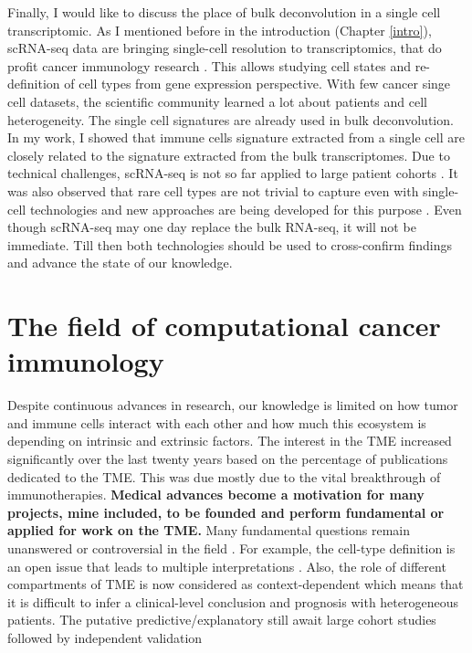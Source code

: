\documentclass[12pt,]{book}
\theoremstyle{definition}
\theoremstyle{definition}
\theoremstyle{definition}
\theoremstyle{remark}
\begin{document}
Finally, I would like to discuss the place of bulk deconvolution in a
single cell transcriptomic. As I mentioned before in the introduction
(Chapter \ref{intro}), scRNA-seq data are bringing single-cell
resolution to transcriptomics, that do profit cancer immunology research
\citep{Neu2017, Giladi2018, Papalexi2017}. This allows studying cell
states and re-definition of cell types from gene expression perspective.
With few cancer singe cell datasets, the scientific community learned a
lot about patients and cell heterogeneity. The single cell signatures
are already used in bulk deconvolution. In my work, I showed that immune
cells signature extracted from a single cell are closely related to the
signature extracted from the bulk transcriptomes. Due to technical
challenges, scRNA-seq is not so far applied to large patient cohorts
\citep{Seymour2017, Levitin2018}. It was also observed that rare cell
types are not trivial to capture even with single-cell technologies and
new approaches are being developed for this purpose \citep{Torre2018}.
Even though scRNA-seq may one day replace the bulk RNA-seq, it will not
be immediate. Till then both technologies should be used to
cross-confirm findings and advance the state of our knowledge.

\hypertarget{the-field-of-computational-cancer-immunology}{%
\section{The field of computational cancer
immunology}\label{the-field-of-computational-cancer-immunology}}

Despite continuous advances in research, our knowledge is limited on how
tumor and immune cells interact with each other and how much this
ecosystem is depending on intrinsic and extrinsic factors. The interest
in the TME increased significantly over the last twenty years based on
the percentage of publications dedicated to the TME. This was due mostly
due to the vital breakthrough of immunotherapies. \textbf{Medical
advances become a motivation for many projects, mine included, to be
founded and perform fundamental or applied for work on the TME. }Many
fundamental questions remain unanswered or controversial in the field
\citep{Zhang2018}. For example, the cell-type definition is an open
issue that leads to multiple interpretations
\citep{EdiorialCellSystems2017}. Also, the role of different
compartments of TME is now considered as context-dependent
\citep{Janssen2017} which means that it is difficult to infer a
clinical-level conclusion and prognosis with heterogeneous patients. The
putative predictive/explanatory still await large cohort studies
followed by independent validation
\end{document}

